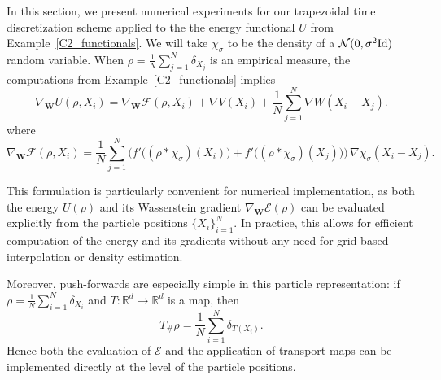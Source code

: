 \documentclass[11pt,a4paper]{amsart}
\newcommand{\1}{\mathds{1}}
\numberwithin{equation}{section}
\begin{document}
In this section, we present numerical experiments for our trapezoidal time discretization scheme applied to the the energy functional $U$ from Example~\ref{C2_functionals}. We will take $\chi_{\sigma}$ to be the density of a $\mathcal{N}(0,\sigma^2\textnormal{Id})$ random variable.  When $\rho = \frac{1}{N} \sum_{j=1}^{N} \delta_{X_j}$ is an empirical measure, the computations from Example~\ref{C2_functionals} implies
\begin{equation}
\nabla_{\mathbf{W}} U(\rho, X_i)
= \nabla_{\mathbf{W}} \mathcal{F}(\rho, X_i)
+ \nabla V(X_i)
+ \frac{1}{N} \sum_{j=1}^{N} \nabla W(X_i - X_j).
\label{grad_E_formula_particle}
\end{equation} where
\[
\nabla_{\mathbf{W}} \mathcal{F}(\rho, X_i)
= \frac{1}{N} \sum_{j=1}^{N} 
\Big( f'\big( (\rho \ast \chi_{\sigma})(X_i) \big)
+ f'\big( (\rho \ast \chi_{\sigma})(X_j) \big) \Big)
\, \nabla \chi_{\sigma}(X_i - X_j).
\]

This formulation is particularly convenient for numerical implementation, 
as both the energy $U(\rho)$ and its Wasserstein gradient 
$\nabla_{\mathbf{W}} \mathcal{E}(\rho)$ can be evaluated explicitly from the particle positions 
$\{X_i\}_{i=1}^N$.  In practice, this allows for efficient computation of the energy and its gradients without any need for grid-based interpolation or density estimation.

\smallskip
Moreover, push-forwards are especially simple in this particle representation: 
if $\rho = \frac{1}{N}\sum_{i=1}^{N} \delta_{X_i}$ and $T:\mathbb{R}^d \to \mathbb{R}^d$ is a map, then
\[
T_{\#}\rho = \frac{1}{N}\sum_{i=1}^{N} \delta_{T(X_i)}.
\]
Hence both the evaluation of $\mathcal{E}$ and the application of transport maps 
can be implemented directly at the level of the particle positions. \smallskip
\end{document}
